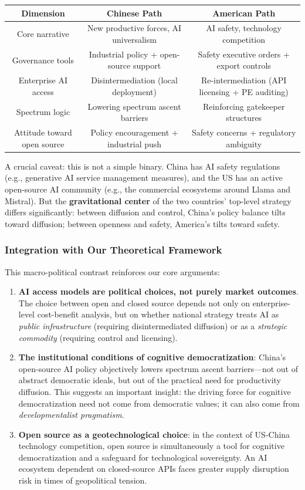 \begin{center}
\begin{tabular}{c|c|c}
\hline
Dimension & Chinese Path & American Path \\
\hline
Core narrative & New productive forces, AI universalism & AI safety, technology competition \\
Governance tools & Industrial policy + open-source support & Safety executive orders + export controls \\
Enterprise AI access & Disintermediation (local deployment) & Re-intermediation (API licensing + PE auditing) \\
Spectrum logic & Lowering spectrum ascent barriers & Reinforcing gatekeeper structures \\
Attitude toward open source & Policy encouragement + industrial push & Safety concerns + regulatory ambiguity \\
\hline
\end{tabular}
\end{center}

A crucial caveat: this is not a simple binary. China has AI safety regulations (e.g., generative AI service management measures), and the US has an active open-source AI community (e.g., the commercial ecosystems around Llama and Mistral). But the \textbf{gravitational center} of the two countries' top-level strategy differs significantly: between diffusion and control, China's policy balance tilts toward diffusion; between openness and safety, America's tilts toward safety.

\subsubsection{Integration with Our Theoretical Framework}

This macro-political contrast reinforces our core arguments:

\begin{enumerate}
\item \textbf{AI access models are political choices, not purely market outcomes}. The choice between open and closed source depends not only on enterprise-level cost-benefit analysis, but on whether national strategy treats AI as \textit{public infrastructure} (requiring disintermediated diffusion) or as a \textit{strategic commodity} (requiring control and licensing).
\item \textbf{The institutional conditions of cognitive democratization}: China's open-source AI policy objectively lowers spectrum ascent barriers---not out of abstract democratic ideals, but out of the practical need for productivity diffusion. This suggests an important insight: the driving force for cognitive democratization need not come from democratic values; it can also come from \textit{developmentalist pragmatism}.
\item \textbf{Open source as a geotechnological choice}: in the context of US-China technology competition, open source is simultaneously a tool for cognitive democratization and a safeguard for technological sovereignty. An AI ecosystem dependent on closed-source APIs faces greater supply disruption risk in times of geopolitical tension.
\end{enumerate}

